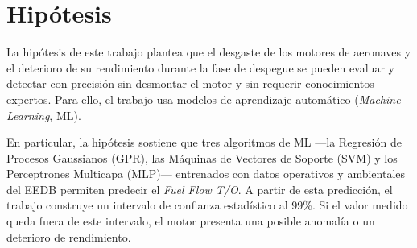 \chapter{Hipótesis}

La hipótesis de este trabajo plantea que el desgaste de los motores de aeronaves y el deterioro de su rendimiento durante la fase de despegue se pueden evaluar y detectar con precisión sin desmontar el motor y sin requerir conocimientos expertos. Para ello, el trabajo usa modelos de aprendizaje automático (\textit{Machine Learning}, ML).

En particular, la hipótesis sostiene que tres algoritmos de ML —la Regresión de Procesos Gaussianos (GPR), las Máquinas de Vectores de Soporte (SVM) y los Perceptrones Multicapa (MLP)— entrenados con datos operativos y ambientales del EEDB permiten predecir el \textit{Fuel Flow T/O}. A partir de esta predicción, el trabajo construye un intervalo de confianza estadístico al 99\%. Si el valor medido queda fuera de este intervalo, el motor presenta una posible anomalía o un deterioro de rendimiento.
